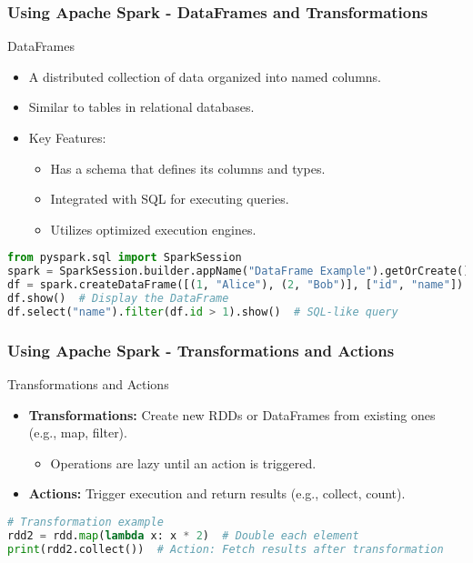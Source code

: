 \documentclass[aspectratio=169]{beamer}
\begin{document}
\begin{frame}[fragile]
    \frametitle{Using Apache Spark - DataFrames and Transformations}
    \begin{block}{DataFrames}
        \begin{itemize}
            \item A distributed collection of data organized into named columns.
            \item Similar to tables in relational databases.
            \item Key Features:
            \begin{itemize}
                \item Has a schema that defines its columns and types.
                \item Integrated with SQL for executing queries.
                \item Utilizes optimized execution engines.
            \end{itemize}
        \end{itemize}
        \begin{lstlisting}[language=Python]
from pyspark.sql import SparkSession
spark = SparkSession.builder.appName("DataFrame Example").getOrCreate()
df = spark.createDataFrame([(1, "Alice"), (2, "Bob")], ["id", "name"])
df.show()  # Display the DataFrame
df.select("name").filter(df.id > 1).show()  # SQL-like query
        \end{lstlisting}
    \end{block}
\end{frame}

\begin{frame}[fragile]
    \frametitle{Using Apache Spark - Transformations and Actions}
    \begin{block}{Transformations and Actions}
        \begin{itemize}
            \item \textbf{Transformations:} Create new RDDs or DataFrames from existing ones (e.g., map, filter).
            \begin{itemize}
                \item Operations are lazy until an action is triggered.
            \end{itemize}
            \item \textbf{Actions:} Trigger execution and return results (e.g., collect, count).
        \end{itemize}
        \begin{lstlisting}[language=Python]
# Transformation example
rdd2 = rdd.map(lambda x: x * 2)  # Double each element
print(rdd2.collect())  # Action: Fetch results after transformation
        \end{lstlisting}
    \end{block}
\end{frame}
\end{document}
